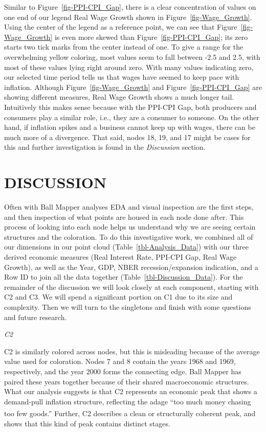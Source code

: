 \documentclass[
  10pt,
  letterpaper,
  DIV=11,
  numbers=noendperiod]{scrartcl}
\begin{document}
Similar to Figure~\ref{fig-PPI-CPI_Gap}, there is a clear concentration
of values on one end of our legend Real Wage Growth shown in
Figure~\ref{fig-Wage_Growth}. Using the center of the legend as a
reference point, we can see that Figure~\ref{fig-Wage_Growth} is even
more skewed than Figure~\ref{fig-PPI-CPI_Gap}; its zero starts two tick
marks from the center instead of one. To give a range for the
overwhelming yellow coloring, most values seem to fall between -2.5 and
2.5, with most of these values lying right around zero. With many values
indicating zero, our selected time period tells us that wages have
seemed to keep pace with inflation. Although
Figure~\ref{fig-Wage_Growth} and Figure~\ref{fig-PPI-CPI_Gap} are
showing different measures, Real Wage Growth shows a much longer tail.
Intuitively this makes sense because with the PPI-CPI Gap, both
producers and consumers play a similar role, i.e., they are a consumer
to someone. On the other hand, if inflation spikes and a business cannot
keep up with wages, there can be much more of a divergence. That said,
nodes 18, 19, and 17 might be cases for this and further investigation
is found in the \emph{Discussion} section.

\section{DISCUSSION}\label{discussion}

Often with Ball Mapper analyses EDA and visual inspection are the first
steps, and then inspection of what points are housed in each node done
after. This process of looking into each node helps us understand why we
are seeing certain structures and the coloration. To do this
investigative work, we combined all of our dimensions in our point cloud
(Table~\ref{tbl-Analysis_Data}) with our three derived economic measures
(Real Interest Rate, PPI-CPI Gap, Real Wage Growth), as well as the
Year, GDP, NBER recession/expansion indication, and a Row ID to join all
the data together (Table~\ref{tbl-Discussion_Data}). For the remainder
of the discussion we will look closely at each component, starting with
C2 and C3. We will spend a significant portion on C1 due to its size and
complexity. Then we will turn to the singletons and finish with some
questions and future research.

\emph{C2}

C2 is similarly colored across nodes, but this is misleading because of
the average value used for coloration. Nodes 7 and 8 contain the years
1968 and 1969, respectively, and the year 2000 forms the connecting
edge. Ball Mapper has paired these years together because of their
shared macroeconomic structures. What our analysis suggests is that C2
represents an economic peak that shows a demand-pull inflation
structure, reflecting the adage ``too much money chasing too few
goods.''\textsuperscript{}
Further, C2 describes a clean or structurally coherent peak, and shows
that this kind of peak contains distinct stages.
\end{document}
